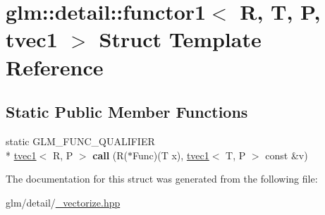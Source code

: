 \hypertarget{structglm_1_1detail_1_1functor1_3_01R_00_01T_00_01P_00_01tvec1_01_4}{\section{glm\-:\-:detail\-:\-:functor1$<$ R, T, P, tvec1 $>$ Struct Template Reference}
\label{structglm_1_1detail_1_1functor1_3_01R_00_01T_00_01P_00_01tvec1_01_4}
}
\subsection*{Static Public Member Functions}
\begin{DoxyCompactItemize}
\item 
\hypertarget{structglm_1_1detail_1_1functor1_3_01R_00_01T_00_01P_00_01tvec1_01_4_af5dd270c9695023917f2c43e61fa10e0}{static G\-L\-M\-\_\-\-F\-U\-N\-C\-\_\-\-Q\-U\-A\-L\-I\-F\-I\-E\-R \\*
\hyperlink{structglm_1_1tvec1}{tvec1}$<$ R, P $>$ {\bfseries call} (R($\ast$Func)(T x), \hyperlink{structglm_1_1tvec1}{tvec1}$<$ T, P $>$ const \&v)}\label{structglm_1_1detail_1_1functor1_3_01R_00_01T_00_01P_00_01tvec1_01_4_af5dd270c9695023917f2c43e61fa10e0}

\end{DoxyCompactItemize}


The documentation for this struct was generated from the following file\-:\begin{DoxyCompactItemize}
\item 
glm/detail/\hyperlink{__vectorize_8hpp}{\-\_\-vectorize.\-hpp}\end{DoxyCompactItemize}
